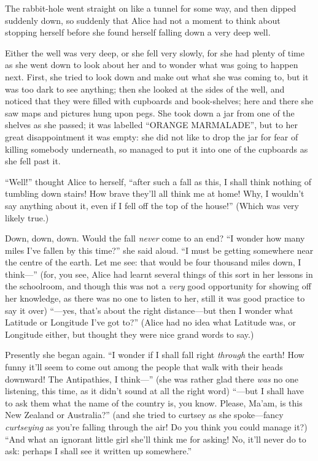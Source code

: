 \documentclass[book, 20pt]{extbook}
\begin{document}
The rabbit-hole went straight on like a tunnel for some way, and then
dipped suddenly down, so suddenly that Alice had not a moment to think
about stopping herself before she found herself falling down a very deep
well.

Either the well was very deep, or she fell very slowly, for she had
plenty of time as she went down to look about her and to wonder what was
going to happen next. First, she tried to look down and make out what
she was coming to, but it was too dark to see anything; then she looked
at the sides of the well, and noticed that they were filled with
cupboards and book-shelves; here and there she saw maps and pictures
hung upon pegs. She took down a jar from one of the shelves as she
passed; it was labelled ``ORANGE MARMALADE'', but to her great
disappointment it was empty: she did not like to drop the jar for fear
of killing somebody underneath, so managed to put it into one of the
cupboards as she fell past it.

``Well!'' thought Alice to herself, ``after such a fall as this, I shall
think nothing of tumbling down stairs! How brave they'll all think me at
home! Why, I wouldn't say anything about it, even if I fell off the top
of the house!'' (Which was very likely true.)

Down, down, down. Would the fall \emph{never} come to an end? ``I wonder
how many miles I've fallen by this time?'' she said aloud. ``I must be
getting somewhere near the centre of the earth. Let me see: that would
be four thousand miles down, I think---'' (for, you see, Alice had
learnt several things of this sort in her lessons in the schoolroom, and
though this was not a \emph{very} good opportunity for showing off her
knowledge, as there was no one to listen to her, still it was good
practice to say it over) ``---yes, that's about the right distance---but
then I wonder what Latitude or Longitude I've got to?'' (Alice had no
idea what Latitude was, or Longitude either, but thought they were nice
grand words to say.)

Presently she began again. ``I wonder if I shall fall right
\emph{through} the earth! How funny it'll seem to come out among the
people that walk with their heads downward! The Antipathies, I
think---'' (she was rather glad there \emph{was} no one listening, this
time, as it didn't sound at all the right word) ``---but I shall have to
ask them what the name of the country is, you know. Please, Ma'am, is
this New Zealand or Australia?'' (and she tried to curtsey as she
spoke---fancy \emph{curtseying} as you're falling through the air! Do
you think you could manage it?) ``And what an ignorant little girl
she'll think me for asking! No, it'll never do to ask: perhaps I shall
see it written up somewhere.''
\end{document}
